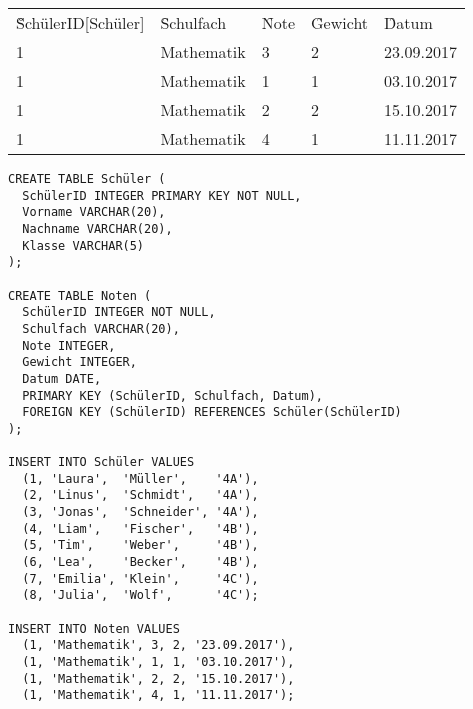 \documentclass{bschlangaul-aufgabe}
\begin{document}

\begin{center}
\begin{tabular}{|lllll|}
\hline
\f{\u{SchülerID{[}Schüler{]}}} & \f{Schulfach}  & \f{Note} & \f{Gewicht} & \f{Datum}  \\
1                              & Mathematik     & 3        & 2           & 23.09.2017 \\
1                              & Mathematik     & 1        & 1           & 03.10.2017 \\
1                              & Mathematik     & 2        & 2           & 15.10.2017 \\
1                              & Mathematik     & 4        & 1           & 11.11.2017 \\
\hline
\end{tabular}
\end{center}

\begin{bAdditum}[Übungsdatenbank]
\begin{verbatim}
CREATE TABLE Schüler (
  SchülerID INTEGER PRIMARY KEY NOT NULL,
  Vorname VARCHAR(20),
  Nachname VARCHAR(20),
  Klasse VARCHAR(5)
);

CREATE TABLE Noten (
  SchülerID INTEGER NOT NULL,
  Schulfach VARCHAR(20),
  Note INTEGER,
  Gewicht INTEGER,
  Datum DATE,
  PRIMARY KEY (SchülerID, Schulfach, Datum),
  FOREIGN KEY (SchülerID) REFERENCES Schüler(SchülerID)
);

INSERT INTO Schüler VALUES
  (1, 'Laura',  'Müller',    '4A'),
  (2, 'Linus',  'Schmidt',   '4A'),
  (3, 'Jonas',  'Schneider', '4A'),
  (4, 'Liam',   'Fischer',   '4B'),
  (5, 'Tim',    'Weber',     '4B'),
  (6, 'Lea',    'Becker',    '4B'),
  (7, 'Emilia', 'Klein',     '4C'),
  (8, 'Julia',  'Wolf',      '4C');

INSERT INTO Noten VALUES
  (1, 'Mathematik', 3, 2, '23.09.2017'),
  (1, 'Mathematik', 1, 1, '03.10.2017'),
  (1, 'Mathematik', 2, 2, '15.10.2017'),
  (1, 'Mathematik', 4, 1, '11.11.2017');
\end{verbatim}
\end{bAdditum}
\end{document}
